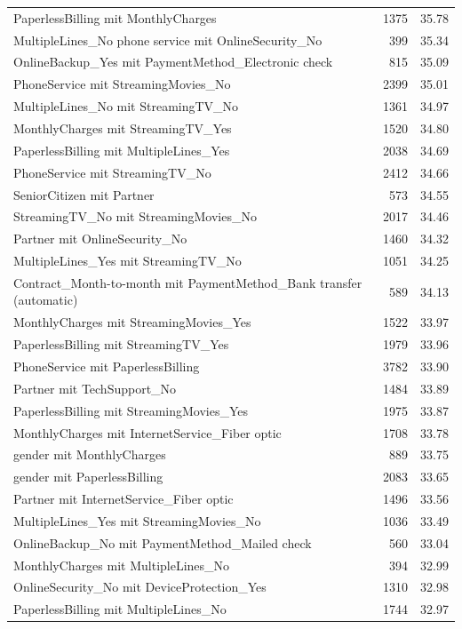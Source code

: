 \documentclass[a4paper,11pt]{article}
\begin{document}
\begin{longtable}{p{9cm}rr}
PaperlessBilling mit MonthlyCharges & 1375 & 35.78 \\
MultipleLines\_No phone service mit OnlineSecurity\_No & 399 & 35.34 \\
OnlineBackup\_Yes mit PaymentMethod\_Electronic check & 815 & 35.09 \\
PhoneService mit StreamingMovies\_No & 2399 & 35.01 \\
MultipleLines\_No mit StreamingTV\_No & 1361 & 34.97 \\
MonthlyCharges mit StreamingTV\_Yes & 1520 & 34.80 \\
PaperlessBilling mit MultipleLines\_Yes & 2038 & 34.69 \\
PhoneService mit StreamingTV\_No & 2412 & 34.66 \\
SeniorCitizen mit Partner & 573 & 34.55 \\
StreamingTV\_No mit StreamingMovies\_No & 2017 & 34.46 \\
Partner mit OnlineSecurity\_No & 1460 & 34.32 \\
MultipleLines\_Yes mit StreamingTV\_No & 1051 & 34.25 \\
Contract\_Month-to-month mit PaymentMethod\_Bank transfer (automatic) & 589 & 34.13 \\
MonthlyCharges mit StreamingMovies\_Yes & 1522 & 33.97 \\
PaperlessBilling mit StreamingTV\_Yes & 1979 & 33.96 \\
PhoneService mit PaperlessBilling & 3782 & 33.90 \\
Partner mit TechSupport\_No & 1484 & 33.89 \\
PaperlessBilling mit StreamingMovies\_Yes & 1975 & 33.87 \\
MonthlyCharges mit InternetService\_Fiber optic & 1708 & 33.78 \\
gender mit MonthlyCharges & 889 & 33.75 \\
gender mit PaperlessBilling & 2083 & 33.65 \\
Partner mit InternetService\_Fiber optic & 1496 & 33.56 \\
MultipleLines\_Yes mit StreamingMovies\_No & 1036 & 33.49 \\
OnlineBackup\_No mit PaymentMethod\_Mailed check & 560 & 33.04 \\
MonthlyCharges mit MultipleLines\_No & 394 & 32.99 \\
OnlineSecurity\_No mit DeviceProtection\_Yes & 1310 & 32.98 \\
PaperlessBilling mit MultipleLines\_No & 1744 & 32.97 \\

\end{longtable}
\end{document}
